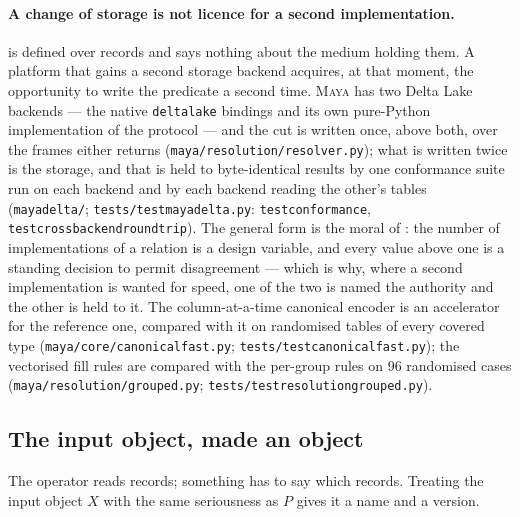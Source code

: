 \documentclass[11pt,a4paper]{article}
\renewcommand{\_}{\oldunderscore\allowbreak}
\theoremstyle{plain}
\theoremstyle{definition}
\theoremstyle{definition}
\theoremstyle{remark}
\begin{document}
\paragraph{A change of storage is not licence for a second implementation.}  is defined
over records and says nothing about the medium holding them. A platform that gains a second storage
backend acquires, at that moment, the opportunity to write the predicate a second time. \textsc{Maya} has
two Delta Lake backends --- the native \texttt{deltalake} bindings and its own pure-Python implementation
of the protocol --- and the cut is written once, above both, over the frames either returns
(\texttt{maya/resolution/resolver.py}); what is written twice is the storage, and that is held to
byte-identical results by one conformance suite run on each backend and by each backend reading the
other's tables (\texttt{maya\_delta/}; \texttt{tests/test\_maya\_delta.py}: \texttt{test\_conformance},
\texttt{test\_cross\_backend\_round\_trip}). The general form is the moral of : the number
of implementations of a relation is a design variable, and every value above one is a standing decision to
permit disagreement --- which is why, where a second implementation is wanted for speed, one of the two
is named the authority and the other is held to it. The column-at-a-time canonical encoder is an accelerator for the reference
one, compared with it on randomised tables of every covered type
(\texttt{maya/core/canonical\_fast.py}; \texttt{tests/test\_canonical\_fast.py}); the vectorised fill rules
are compared with the per-group rules on 96 randomised cases
(\texttt{maya/resolution/grouped.py}; \texttt{tests/test\_resolution\_grouped.py}).

\subsection{The input object, made an object}

The operator reads records; something has to say which records. Treating the input object $X$ with the
same seriousness as $P$ gives it a name and a version.
\end{document}
